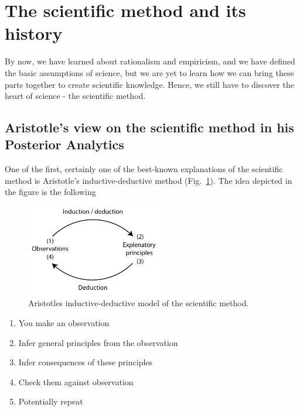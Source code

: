 \documentclass{tufte-book}
\begin{document}


\section{The scientific method and its history}\label{sec: scientific method}


By now, we have learned about rationalism and empiricism, and we have defined the basic assumptions of science, but we are yet to learn how we can bring these parts together to create scientific knowledge. Hence, we still have to discover the heart of science - the scientific method. 

\subsection{Aristotle's view on the scientific method in his Posterior Analytics}


One of the first, certainly one of the best-known explanations of the scientific method is Aristotle's inductive-deductive method (Fig.~\ref{fig: InductiveDeductiveAristotle}). The idea depicted in the figure is the following 

\begin{figure}[]
\begin{center}
\includegraphics[width = 6cm]{figures/InductiveDeductiveAristotle.pdf}
\caption{Aristotles inductive-deductive model of the scientific method.}
\label{fig: InductiveDeductiveAristotle}
\end{center}
\end{figure}

\begin{enumerate}
\item You make an observation
\item Infer general principles from the observation
\item Infer consequences of these principles
\item Check them against observation
\item Potentially repeat
\end{enumerate}
\end{document}
